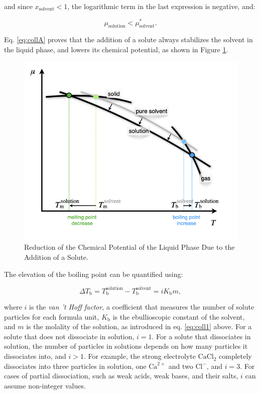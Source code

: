 \documentclass[
  9pt,
]{extbook}
\theoremstyle{definition}
\theoremstyle{definition}
\theoremstyle{definition}
\theoremstyle{remark}
\begin{document}
and since \(x_{\text{solvent}}<1\), the logarithmic term in the last expression is negative, and:

\begin{equation}
\mu_{\text{solution}} < \mu_{\text{solvent}}^*. 
\label{eq:collB}
\end{equation}

Eq. \eqref{eq:collA} proves that the addition of a solute always stabilizes the solvent in the liquid phase, and lowers its chemical potential, as shown in Figure \ref{fig:FigSol2}.

\begin{figure}

{\centering \includegraphics[width=0.6\linewidth]{./img/OEP_Figures.034} 

}

\caption{Reduction of the Chemical Potential of the Liquid Phase Due to the Addition of a Solute.}\label{fig:FigSol2}
\end{figure}

The elevation of the boiling point can be quantified using:

\begin{equation}
\Delta T_{\text{b}}=T_{\text{b}}^{\text{solution}}-T_{\text{b}}^{\text{solvent}}=iK_{\text{b}}m,
\label{eq:coll3}
\end{equation}

where \(i\) is the \emph{van 't Hoff factor}, a coefficient that measures the number of solute particles for each formula unit, \(K_{\text{b}}\) is the ebullioscopic constant of the solvent, and \(m\) is the molality of the solution, as introduced in eq. \eqref{eq:coll1} above. For a solute that does not dissociate in solution, \(i=1\). For a solute that dissociates in solution, the number of particles in solutions depends on how many particles it dissociates into, and \(i>1\). For example, the strong electrolyte \(\mathrm{Ca}\mathrm{Cl}_2\) completely dissociates into three particles in solution, one \(\mathrm{Ca}^{2+}\) and two \(\mathrm{Cl}^-\), and \(i=3\). For cases of partial dissociation, such as weak acids, weak bases, and their salts, \(i\) can assume non-integer values.
\end{document}
